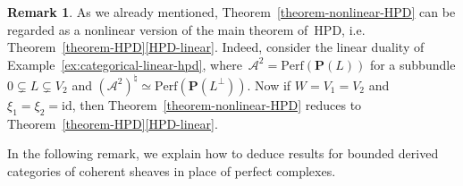 \documentclass[11pt, reqno]{amsart}
\numberwithin{equation}{section}
\theoremstyle{plain}
\theoremstyle{definition}
\newtheorem{remark}[theorem]{Remark}
\newcommand{\Perf}{\mathrm{Perf}}
\newcommand{\hpd}{{\natural}}
\newcommand{\id}{\mathrm{id}}
\newcommand{\cA}{\mathcal{A}}
\newcommand{\bP}{\mathbf{P}}
\begin{document}
\begin{remark}
\label{remark:hpd-nonlinear-vs-linear}
As we already mentioned, Theorem~\ref{theorem-nonlinear-HPD} can be regarded as a nonlinear 
version of the main theorem of~HPD, i.e. Theorem~\ref{theorem-HPD}\eqref{HPD-linear}. 
Indeed, consider the linear duality of Example~\ref{ex:categorical-linear-hpd}, 
where~$\cA^2 = \Perf(\bP(L))$ for a subbundle $0 \subsetneq L \subsetneq V_2$ and 
$(\cA^2)^{\hpd} \simeq \Perf(\bP(L^{\perp}))$. 
Now if $W = V_1 = V_2$ and $\xi_1 = \xi_2 = \id$, then 
Theorem~\ref{theorem-nonlinear-HPD} reduces to Theorem~\ref{theorem-HPD}\eqref{HPD-linear}. 
\end{remark}

In the following remark, we explain how to deduce results for 
bounded derived categories of coherent sheaves in place of perfect complexes. 
\end{document}
